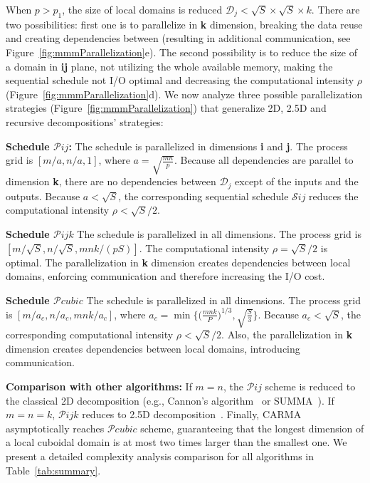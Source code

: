 \documentclass[sigplan,review,anonymous,10pt]{acmart}\settopmatter{printfolios=true,printccs=false,printacmref=false}
\newcommand\mac[1]{\textcolor{red}{[Mac: #1]}}
\newcommand{\macb}[1]{\textbf{\textsf{#1}}}
\begin{document}
When $p > p_1$, the size of local domains is reduced $\mathcal{D}_j < \sqrt{S} 
\times \sqrt{S} \times k $. There are two possibilities: first one is to 
parallelize in \textbf{k} dimension, breaking the data reuse and creating
dependencies between (resulting in additional communication, see
Figure~\ref{fig:mmmParallelization}e). The second possibility is to reduce the 
size of a domain in \textbf{ij} plane, not utilizing the whole available
memory, making the sequential schedule not I/O optimal and decreasing the
computational intensity $\rho$ (Figure~\ref{fig:mmmParallelization}d). We
  now analyze three possible parallelization
  strategies (Figure~\ref{fig:mmmParallelization}) that generalize 2D, 2.5D and 
  recursive decompositions' strategies:


\macb{Schedule $\mathcal{P}ij$:} 
%
The schedule is parallelized in dimensions \textbf{i} and \textbf{j}. The
process grid is $[m/a , n/a, 1]$, where $a = \sqrt{\frac{mn}{p}}$.  Because all
dependencies are parallel to dimension \textbf{k}, there are no dependencies
between $\mathcal{D}_j$ except of the inputs and the outputs.  Because $a <
\sqrt{S}$, the corresponding sequential schedule $\mathcal{S}ij$ reduces the
computational intensity $\rho < \sqrt{S}/2$.

\macb{Schedule $\mathcal{P}ijk$}
%
The schedule is parallelized in all dimensions. The process grid is
$[m/\sqrt{S} , n/\sqrt{S}, mnk/(pS)]$.  The
computational intensity $\rho = \sqrt{S}/2$ is optimal. The parallelization in
\textbf{k} dimension creates dependencies between local domains, enforcing
communication and therefore increasing the I/O cost.

\macb{Schedule $\mathcal{P}cubic$} 
%
The schedule is parallelized in all dimensions. The process grid is $[m/a_c ,
n/a_c, mnk/a_c]$, where $a_c = \min\Big\{\big(\frac{mnk}{P}\big)^{1/3},
\sqrt{\frac{S}{3}}\Big\}$. Because $a_c < \sqrt{S}$, the corresponding
computational intensity $\rho < \sqrt{S}/2$.  Also,  the parallelization in
\textbf{k} dimension creates dependencies between local domains, introducing 
communication. 

\macb{Comparison with other algorithms: 
}
%
If $m = n$, the $\mathcal{P}ij$ scheme is reduced to the classical 2D
decomposition (e.g., Cannon's algorithm~\cite{Cannon} or SUMMA~\cite{summa}).
If $m = n = k$, $\mathcal{P}ijk$ reduces to 2.5D decomposition~\cite{25d}.
Finally, CARMA~\cite{CARMA} asymptotically reaches $\mathcal{P}cubic$ scheme,
guaranteeing that the longest dimension of a local cuboidal domain is at most
two times larger than the smallest one. We present a detailed complexity 
analysis comparison for all algorithms in Table~\ref{tab:summary}.
\end{document}
